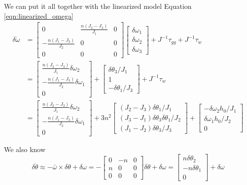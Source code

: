 \documentclass[]{article}
\begin{document}
We can put it all together with the linearized model Equation \eqref{eqn:linearized_omega}
\begin{align}
	\delta \dot{\omega} & = \begin{bmatrix}
		0 & \frac{n(J_2 - J_3)}{J_1} & 0 \\
		-\frac{n(J_1 - J_3)}{J_2} & 0 & 0 \\
		0 & 0 & 0
	\end{bmatrix} \begin{bmatrix}
	\delta \omega_1 \\
	\delta \omega_2 \\
	\delta \omega_3
\end{bmatrix} + J^{-1} \tau_{gg} + J^{-1} \tau_w \\
& = \begin{bmatrix}
	\frac{n(J_2 - J_3)}{J_1} \delta \omega_2 \\
	-\frac{n(J_1 - J_3)}{J_2} \delta \omega_1 \\
	0
\end{bmatrix} + \begin{bmatrix}
\delta \theta_3/J_1 \\
1 \\
- \delta \theta_1/J_3
\end{bmatrix} + J^{-1} \tau_w \\
\label{eqn:all_torque}
& = \begin{bmatrix}
	\frac{n(J_2 - J_3)}{J_1} \delta \omega_2 \\
	-\frac{n(J_1 - J_3)}{J_2} \delta \omega_1 \\
	0
\end{bmatrix} +  3 n^2 \begin{bmatrix}
(J_2 - J_3) \delta \theta_1/J_1 \\
(J_3 - J_1) \delta \theta_3 \delta \theta_1/J_2 \\
(J_1 - J_2) \delta \theta_3/J_3
\end{bmatrix} + \begin{bmatrix}
-\delta \omega_2 h_0/J_1 \\
\delta \omega_1 h_0/J_2 \\
0
\end{bmatrix}
\end{align}

We also know
\begin{equation}
	\label{eqn:dtheta}
	\delta \dot{\theta} \approx - \bar{\omega} \times \delta \theta + \delta \omega = -\begin{bmatrix}
		0 &-n & 0 \\
		n & 0 & 0 \\
		0 & 0 & 0 \end{bmatrix} \delta \theta + \delta \omega = \begin{bmatrix}
		n \delta \theta_2 \\
		-n \delta \theta_1 \\
		0 
	\end{bmatrix} + \delta \omega
\end{equation}
\end{document}
